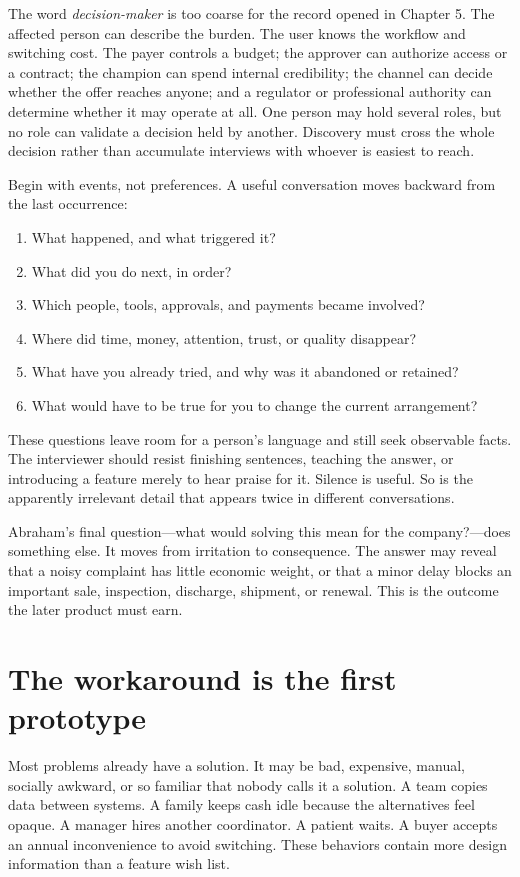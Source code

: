 The word \emph{decision-maker} is too coarse for the record opened in Chapter 5.
The affected person can describe the burden. The user knows the workflow and
switching cost. The payer controls a budget; the approver can authorize access
or a contract; the champion can spend internal credibility; the channel can
decide whether the offer reaches anyone; and a regulator or professional
authority can determine whether it may operate at all. One person may hold
several roles, but no role can validate a decision held by another. Discovery
must cross the whole decision rather than accumulate interviews with whoever is
easiest to reach.

Begin with events, not preferences. A useful conversation moves backward from
the last occurrence:

\begin{enumerate}[itemsep=0.2em]
\item What happened, and what triggered it?
\item What did you do next, in order?
\item Which people, tools, approvals, and payments became involved?
\item Where did time, money, attention, trust, or quality disappear?
\item What have you already tried, and why was it abandoned or retained?
\item What would have to be true for you to change the current arrangement?
\end{enumerate}

These questions leave room for a person's language and still seek observable
facts. The interviewer should resist finishing sentences, teaching the answer,
or introducing a feature merely to hear praise for it. Silence is useful. So is
the apparently irrelevant detail that appears twice in different conversations.

Abraham's final question---what would solving this mean for the company?---does
something else. It moves from irritation to consequence. The answer may reveal
that a noisy complaint has little economic weight, or that a minor delay blocks
an important sale, inspection, discharge, shipment, or renewal. This is the
outcome the later product must earn.

\section{The workaround is the first prototype}

Most problems already have a solution. It may be bad, expensive, manual,
socially awkward, or so familiar that nobody calls it a solution. A team copies
data between systems. A family keeps cash idle because the alternatives feel
opaque. A manager hires another coordinator. A patient waits. A buyer accepts
an annual inconvenience to avoid switching. These behaviors contain more
design information than a feature wish list.

